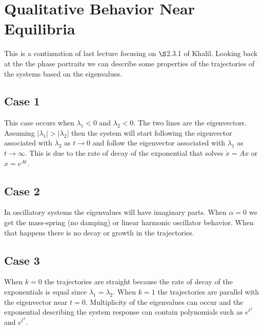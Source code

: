 \mainmatter%
\setcounter{page}{1}

\lectureseries[\course]{\course}

\date{January 12, 2010}

\setaddress%

\setcounter{lecture}{2}
\setcounter{chapter}{2}


\section{Qualitative Behavior Near Equilibria}
This is a continuation of last lecture focusing on $\S$2.3.1 of Khalil.
Looking back at the the phase portraits we can describe some properties of the trajectories of the systems based on the eigenvalues.

\subsection{Case 1}
This case occurs when $\lambda_1<0$ and $\lambda_2<0$.
The two lines are the eigenvectors.
Assuming $|\lambda_1| > |\lambda_2|$ then the system will start following the eigenvector associated with $\lambda_2$ as $t\to0$ and follow the eigenvector associated with $\lambda_1$ as $t\to\infty$.
This is due to the rate of decay of the exponential that solves $\dot{x}=Ax$ or $x=e^{At}$.

\subsection{Case 2}
In oscillatory systems the eigenvalues will have imaginary parts.
When $\alpha=0$ we get the mass-spring (no damping) or linear harmonic oscillator behavior.
When that happens there is no decay or growth in the trajectories.

\subsection{Case 3}
When $k=0$ the trajectories are straight because the rate of decay of the exponentials is equal since $\lambda_1=\lambda_2$.
When $k=1$ the trajectories are parallel with the eigenvector near $t=0$.
Multiplicity of the eigenvalues can occur and the exponential describing the system response can contain polynomials such as $e^{t^2}$ and $e^{t^3}$.

